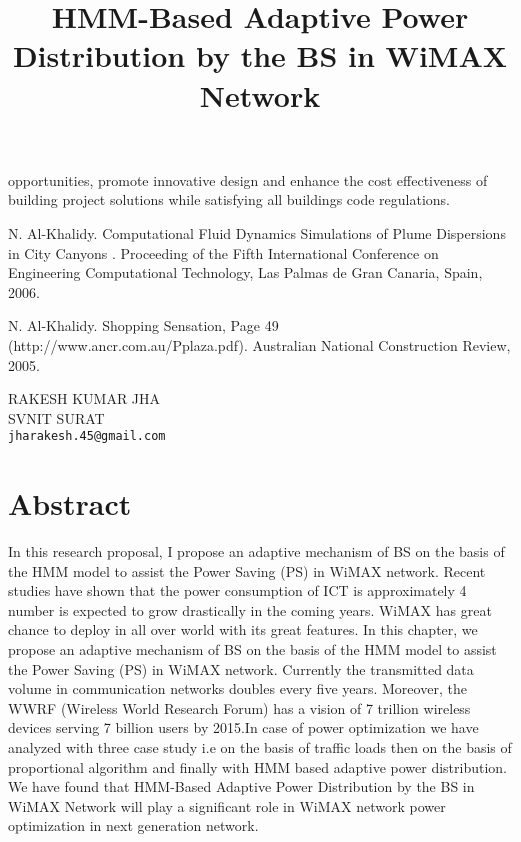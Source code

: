 \documentclass[article,A4,11pt]{llncs}%
\begin{document}
opportunities, promote innovative design and enhance the cost effectiveness of building project solutions while satisfying all buildings code regulations.



\begin{thebibliography}{10}
{\sc N. Al-Khalidy}. {Computational Fluid Dynamics Simulations of Plume Dispersions in City Canyons }. Proceeding of the Fifth International Conference on Engineering Computational Technology, Las Palmas de Gran Canaria, Spain, 2006.

{\sc N. Al-Khalidy}. {Shopping Sensation, Page 49 (http://www.ancr.com.au/Pplaza.pdf)}. Australian National Construction Review, 2005.
\end{thebibliography}

\title{HMM-Based Adaptive Power Distribution by the BS in WiMAX Network}
 \author{} \institute{}
\maketitle
\begin{center}
{\large RAKESH KUMAR JHA}\\
SVNIT SURAT\\
{\tt jharakesh.45@gmail.com}
\end{center}

\section*{Abstract}
In this research proposal, I propose an adaptive mechanism of BS on the basis of the HMM
model to assist the Power Saving (PS) in WiMAX network. Recent studies have shown that the power
consumption of ICT is approximately 4 %
number is expected to grow drastically in the coming years. WiMAX has great chance to deploy in all
over world with its great features. In this chapter, we propose an adaptive mechanism of BS on the basis
of the HMM model to assist the Power Saving (PS) in WiMAX network. Currently the transmitted data
volume in communication networks doubles every five years. Moreover, the WWRF (Wireless World
Research Forum) has a vision of 7 trillion wireless devices serving 7 billion users by 2015.In case of
power optimization we have analyzed with three case study i.e on the basis of traffic loads then on the
basis of proportional algorithm and finally with HMM based adaptive power distribution. We have found
that HMM-Based Adaptive Power Distribution by the BS in WiMAX Network will play a significant role
in WiMAX network power optimization in next generation network.
\end{document}

